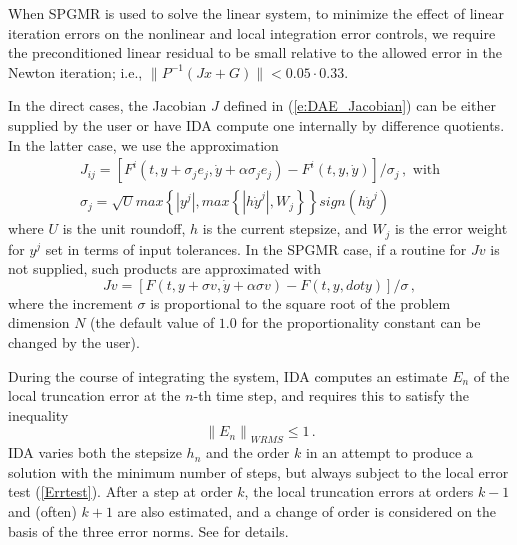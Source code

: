 When SPGMR is used to solve the linear system, to minimize the effect of
linear iteration errors on the nonlinear and local integration error controls,
we require the preconditioned linear residual to be small relative to the 
allowed error in the Newton iteration; i.e., 
$\| P^{-1}(Jx+G) \| < 0.05 \cdot 0.33$.

In the direct cases, the Jacobian $J$ defined in (\ref{e:DAE_Jacobian}) 
can be either supplied by the user or have IDA compute one internally 
by difference quotients. In the latter case, we use the approximation
\begin{gather*}
  J_{ij} = [F^i(t,y+\sigma_j e_j,{\dot y}+\alpha\sigma_j e_j) - 
  F^i(t,y,{\dot y})]/\sigma_j \, , \text{ with}\\
  \sigma_j = \sqrt{U} max\left\{ |y^j|, max\left\{ |h{\dot y}^j|,W_j \right\}\right\}
  sign(h {\dot y}^j)
\end{gather*}
where $U$ is the unit roundoff, $h$ is the current stepsize, and $W_j$ is 
the error weight for $y^j$ set in terms of input tolerances. 
%
In the SPGMR case, if a routine for $Jv$ is not supplied, such products are
approximated with
\begin{equation*}
Jv = [F(t,y+\sigma v,{\dot y}+\alpha\sigma v) - F(t,y,{dot y})]/\sigma \, ,
\end{equation*}
where the increment $\sigma$ is proportional to the square root of the problem 
dimension $N$ (the default value of $1.0$ for the proportionality constant can 
be changed by the user).

During the course of integrating the system, IDA computes an estimate
$E_n$ of the local truncation error at the $n$-th time step, and
requires this to satisfy the inequality
\begin{equation}\label{Errtest}
  \left\| E_n\right\|_{WRMS} \le 1 \, .               
\end{equation}
%
IDA varies both the stepsize $h_n$ and the order $k$ in an attempt to
produce a solution with the minimum number of steps, but always
subject to the local error test (\ref{Errtest}).  After a step at
order $k$, the local truncation errors at orders $k-1$ and (often)
$k+1$ are also estimated, and a change of order is considered on the
basis of the three error norms.  See \cite{BCP:96} for details.  

